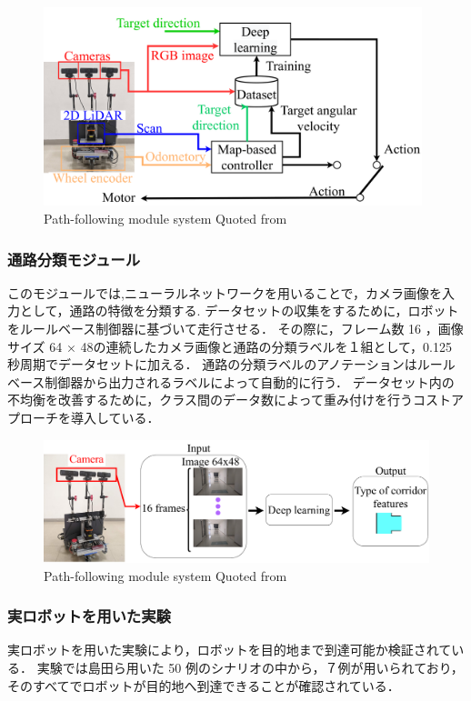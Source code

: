 \begin{figure}[htbp]
  \centering
   \includegraphics[width=110mm]{images/pdf/haruyama/pathfollow_sys.pdf}
   \caption{Path-following module system Quoted from \cite{haruyama2023}}
   \label{fig:pathfollow}
\end{figure}



\subsubsection{通路分類モジュール}
このモジュールでは,ニューラルネットワークを用いることで，カメラ画像を入力として，通路の特徴を分類する.
データセットの収集をするために，ロボットをルールベース制御器に基づいて走行させる．
その際に，フレーム数 16 ，画像サイズ 64 × 48の連続したカメラ画像と通路の分類ラベルを１組として，0.125 秒周期でデータセットに加える．
通路の分類ラベルのアノテーションはルールベース制御器から出力されるラベルによって自動的に行う．
データセット内の不均衡を改善するために，クラス間のデータ数によって重み付けを行うコストアプローチを導入している．

\begin{figure}[htbp]
  \centering
   \includegraphics[width=130mm]{images/pdf/haruyama/intersection_sys.pdf}
   \caption{Path-following module system Quoted from \cite{haruyama2023}}
   \label{fig:intersection}
\end{figure}

\subsubsection{実ロボットを用いた実験}
実ロボットを用いた実験により，ロボットを目的地まで到達可能か検証されている．
実験では島田ら用いた 50 例のシナリオの中から，７例が用いられており，そのすべてでロボットが目的地へ到達できることが確認されている．